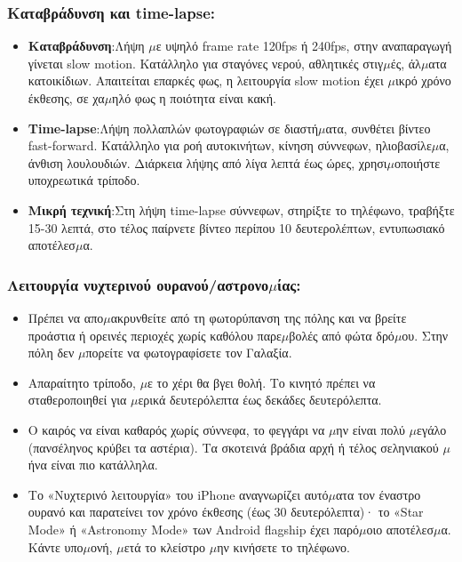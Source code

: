 \subsubsection*{Καταβράδυνση και time-lapse:}

\begin{itemize}
  \item \textbf{Καταβράδυνση}:Λήψη $\mu$ε υψηλό frame rate 120fps ή 240fps, στην αναπαραγωγή γίνεται slow motion. Κατάλληλο για σταγόνες νερού, αθλητικές στιγ$\mu$ές, άλ$\mu$ατα κατοικίδιων. Απαιτείται επαρκές φως, η λειτουργία slow motion έχει $\mu$ικρό χρόνο έκθεσης, σε χα$\mu$ηλό φως η ποιότητα είναι κακή.
  \item \textbf{Time-lapse}:Λήψη πολλαπλών φωτογραφιών σε διαστή$\mu$ατα, συνθέτει βίντεο fast-forward. Κατάλληλο για ροή αυτοκινήτων, κίνηση σύννεφων, ηλιοβασίλε$\mu$α, άνθιση λουλουδιών. Διάρκεια λήψης από λίγα λεπτά έως ώρες, χρησι$\mu$οποιήστε υποχρεωτικά τρίποδο.
  \item \textbf{Μικρή τεχνική}:Στη λήψη time-lapse σύννεφων, στηρίξτε το τηλέφωνο, τραβήξτε 15-30 λεπτά, στο τέλος παίρνετε βίντεο περίπου 10 δευτερολέπτων, εντυπωσιακό αποτέλεσ$\mu$α.
\end{itemize}

\subsubsection*{Λειτουργία νυχτερινού ουρανού/αστρονο$\mu$ίας:}

\begin{itemize}
  \item Πρέπει να απο$\mu$ακρυνθείτε από τη φωτορύπανση της πόλης και να βρείτε προάστια ή ορεινές περιοχές χωρίς καθόλου παρε$\mu$βολές από φώτα δρό$\mu$ου. Στην πόλη δεν $\mu$πορείτε να φωτογραφίσετε τον Γαλαξία.
  \item Απαραίτητο τρίποδο, $\mu$ε το χέρι θα βγει θολή. Το κινητό πρέπει να σταθεροποιηθεί για $\mu$ερικά δευτερόλεπτα έως δεκάδες δευτερόλεπτα.
  \item Ο καιρός να είναι καθαρός χωρίς σύννεφα, το φεγγάρι να $\mu$ην είναι πολύ $\mu$εγάλο (πανσέληνος κρύβει τα αστέρια). Τα σκοτεινά βράδια αρχή ή τέλος σεληνιακού $\mu$ήνα είναι πιο κατάλληλα.
  \item Το «Νυχτερινό λειτουργία» του iPhone αναγνωρίζει αυτό$\mu$ατα τον έναστρο ουρανό και παρατείνει τον χρόνο έκθεσης (έως 30 δευτερόλεπτα)· το «Star Mode» ή «Astronomy Mode» των Android flagship έχει παρό$\mu$οιο αποτέλεσ$\mu$α. Κάντε υπο$\mu$ονή, $\mu$ετά το κλείστρο $\mu$ην κινήσετε το τηλέφωνο.
\end{itemize}

